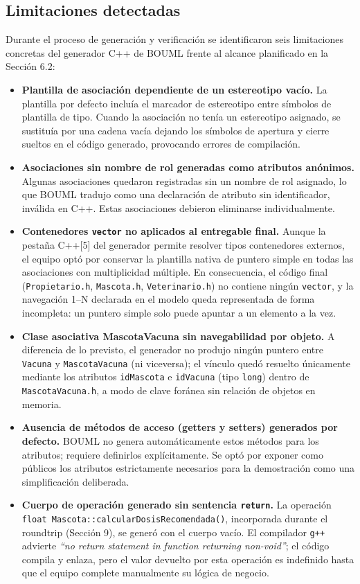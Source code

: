 \documentclass[journal,onecolumn]{IEEEtran}
\begin{document}
	\subsection{Limitaciones detectadas}
	Durante el proceso de generación y verificación se identificaron seis limitaciones concretas del generador C++ de BOUML frente al alcance planificado en la Sección 6.2:
	\begin{itemize}
		\item \textbf{Plantilla de asociación dependiente de un estereotipo vacío.} La plantilla por defecto incluía el marcador de estereotipo entre símbolos de plantilla de tipo. Cuando la asociación no tenía un estereotipo asignado, se sustituía por una cadena vacía dejando los símbolos de apertura y cierre sueltos en el código generado, provocando errores de compilación.
		\item \textbf{Asociaciones sin nombre de rol generadas como atributos anónimos.} Algunas asociaciones quedaron registradas sin un nombre de rol asignado, lo que BOUML tradujo como una declaración de atributo sin identificador, inválida en C++. Estas asociaciones debieron eliminarse individualmente.
		\item \textbf{Contenedores \texttt{vector} no aplicados al entregable final.} Aunque la pestaña C++[5] del generador permite resolver tipos contenedores externos, el equipo optó por conservar la plantilla nativa de puntero simple en todas las asociaciones con multiplicidad múltiple. En consecuencia, el código final (\texttt{Propietario.h}, \texttt{Mascota.h}, \texttt{Veterinario.h}) no contiene ningún \texttt{vector}, y la navegación 1--N declarada en el modelo queda representada de forma incompleta: un puntero simple solo puede apuntar a un elemento a la vez.
		\item \textbf{Clase asociativa MascotaVacuna sin navegabilidad por objeto.} A diferencia de lo previsto, el generador no produjo ningún puntero entre \texttt{Vacuna} y \texttt{MascotaVacuna} (ni viceversa); el vínculo quedó resuelto únicamente mediante los atributos \texttt{idMascota} e \texttt{idVacuna} (tipo \texttt{long}) dentro de \texttt{MascotaVacuna.h}, a modo de clave foránea sin relación de objetos en memoria.
		\item \textbf{Ausencia de métodos de acceso (getters y setters) generados por defecto.} BOUML no genera automáticamente estos métodos para los atributos; requiere definirlos explícitamente. Se optó por exponer como públicos los atributos estrictamente necesarios para la demostración como una simplificación deliberada.
		\item \textbf{Cuerpo de operación generado sin sentencia \texttt{return}.} La operación \texttt{float Mascota::calcularDosisRecomendada()}, incorporada durante el roundtrip (Sección 9), se generó con el cuerpo vacío. El compilador \texttt{g++} advierte \textit{``no return statement in function returning non-void''}; el código compila y enlaza, pero el valor devuelto por esta operación es indefinido hasta que el equipo complete manualmente su lógica de negocio.
	\end{itemize}
	
\end{document}
